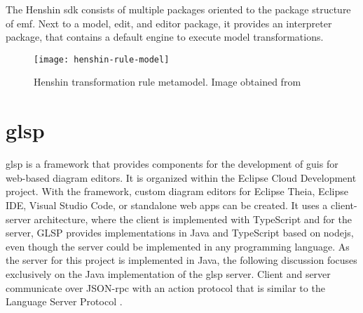   The Henshin \acs{sdk} consists of multiple packages oriented to the package structure of \ac{emf}. Next to a model, edit, and editor package, it provides an interpreter package, that contains a default engine to execute model transformations.

  \begin{figure}[h]
    \centering
    \texttt{[image: henshin-rule-model]}
    \caption{Henshin transformation rule metamodel. Image obtained from \cite{henshin-repo}}
    \label{fig:henshin-rule-model}
  \end{figure}

  \section{\acf{glsp}}
  \label{subsec:glsp}

  \ac{glsp} is a framework that provides components for the development of \acsp{gui} for web-based diagram editors.
  \cite{glsp-repo} It is organized within the Eclipse Cloud Development project. \cite{glsp-doc} With the framework, custom diagram editors for Eclipse Theia, Eclipse IDE, Visual Studio Code, or standalone web apps can be created. It uses a client-server architecture, where the client is implemented with TypeScript and for the server, GLSP provides implementations in Java and TypeScript based on nodejs, even though the server could be implemented in any programming language. As the server for this project is implemented in Java, the following discussion focuses exclusively on the Java implementation of the \ac{glsp} server. Client and server communicate over JSON-\acs{rpc} with an action protocol that is similar to the Language Server Protocol \cite{lsp-repo}. 

